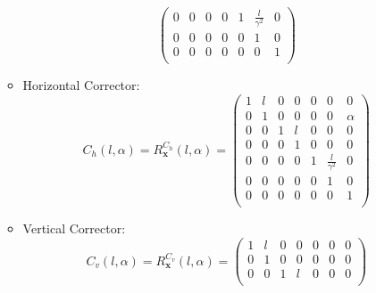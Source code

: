 \begin{itemize}
\begin{itemize}
\begin{equation*}
\begin{pmatrix}
                                                  0 & 0 & 0 & 0 & 1 & \frac{l}{\gamma^2} & 0 \\ %
                                                  0 & 0 & 0 & 0 & 0 & 1 & 0 \\ %
                                                  0 & 0 & 0 & 0 & 0 & 0 & 1 \\
                                              \end{pmatrix}
            \end{equation*}
        \item Horizontal Corrector: 
            \begin{equation*}
                C_h(l,\alpha) = R_{\bm{x}}^{C_h}(l,\alpha) = \begin{pmatrix}
                                                                 1 & l & 0 & 0 & 0 & 0 & 0 \\ %
                                                                 0 & 1 & 0 & 0 & 0 & 0 & \alpha \\ %
                                                                 0 & 0 & 1 & l & 0 & 0 & 0 \\ %
                                                                 0 & 0 & 0 & 1 & 0 & 0 & 0 \\ %
                                                                 0 & 0 & 0 & 0 & 1 & \frac{l}{\gamma^2} & 0 \\ %
                                                                 0 & 0 & 0 & 0 & 0 & 1 & 0 \\ %
                                                                 0 & 0 & 0 & 0 & 0 & 0 & 1 \\
                                                             \end{pmatrix}
            \end{equation*}
        \item Vertical Corrector:
            \begin{equation*}
                C_v(l,\alpha) = R_{\bm{x}}^{C_v}(l,\alpha) = \begin{pmatrix}
                                                                     1 & l & 0 & 0 & 0 & 0 & 0 \\ %
                                                                     0 & 1 & 0 & 0 & 0 & 0 & 0 \\ %
                                                                     0 & 0 & 1 & l & 0 & 0 & 0 \\ %

\end{pmatrix}
\end{equation*}
\end{itemize}
\end{itemize}
